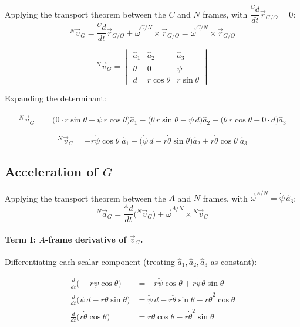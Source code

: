 \documentclass[11pt]{article}
\begin{document}
Applying the transport theorem between the $C$ and $N$ frames, with $\dfrac{{}^{C}d}{dt}\vec r_{G/O}=0$:
\[
    {}^{N}\vec v_G = \frac{{}^{C}d}{dt}\vec r_{G/O} + \vec\omega^{C/N}\times\vec r_{G/O}
    = \vec\omega^{C/N}\times\vec r_{G/O}
\]

\[
    {}^{N}\vec v_G =
    \begin{vmatrix}
        \hat a_1 & \hat a_2 & \hat a_3\\
        \dot\theta & 0 & \dot\psi\\
        d & r\cos\theta & r\sin\theta
    \end{vmatrix}
\]

Expanding the determinant:

\begin{align*}
    {}^{N}\vec v_G
    &= \big(0\cdot r\sin\theta - \dot\psi\, r\cos\theta\big)\hat a_1
     - \big(\dot\theta\, r\sin\theta - \dot\psi\, d\big)\hat a_2
     + \big(\dot\theta\, r\cos\theta - 0\cdot d\big)\hat a_3
\end{align*}

\begin{result}
\[
    {}^{N}\vec v_G =
    -r\dot\psi\cos\theta\;\hat a_1
    + \big(\dot\psi\, d - r\dot\theta\sin\theta\big)\hat a_2
    + r\dot\theta\cos\theta\;\hat a_3
\]
\end{result}

\subsection*{Acceleration of $G$}

Applying the transport theorem between the $A$ and $N$ frames, with $\vec\omega^{A/N} = \dot\psi\,\hat a_3$:
\[
    {}^{N}\vec a_G = \frac{{}^{A}d}{dt}\Big({}^{N}\vec v_G\Big) + \vec\omega^{A/N}\times {}^{N}\vec v_G
\]

\paragraph{Term I: $A$-frame derivative of $\vec v_G$.}
Differentiating each scalar component (treating $\hat a_1,\hat a_2,\hat a_3$ as constant):

\begin{align*}
    \frac{d}{dt}\big(-r\dot\psi\cos\theta\big)
        &= -r\ddot\psi\cos\theta + r\dot\psi\dot\theta\sin\theta \\
    \frac{d}{dt}\big(\dot\psi\, d - r\dot\theta\sin\theta\big)
        &= \ddot\psi\, d - r\ddot\theta\sin\theta - r\dot\theta^{2}\cos\theta \\
    \frac{d}{dt}\big(r\dot\theta\cos\theta\big)
        &= r\ddot\theta\cos\theta - r\dot\theta^{2}\sin\theta
\end{align*}
\end{document}
